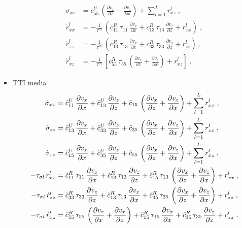 \begin{itemize}
\begin{subequations}
\begin{align}
            \dot{\sigma}_{xz} &= c_{55}^U\,\left(\frac{\partial v_x}{\partial z}+\frac{\partial v_z}{\partial x}\right)+\sum_{l=1}^{L}r_{xz}^l\;,\\     
            \dot{r}_{xx}^l &= -\frac{1}{\tau^{\sigma l}}\,\left(c_{11}^R\,\tau_{11}\,\frac{\partial v_x}{\partial x}+c_{13}^R\,\tau_{13}\,\frac{\partial v_z}{\partial z}+r_{xx}^l\right)\;,\\
            \dot{r}_{zz}^l &= -\frac{1}{\tau^{\sigma l}}\, \left(c_{13}^R\,\tau_{13}\,\frac{\partial v_x}{\partial x}+c_{33}^R\,\tau_{33}\,\frac{\partial v_z}{\partial z}+r_{zz}^l \right)\,,\\
            \dot{r}_{xz}^l &= -\frac{1}{\tau^{\sigma l}}\, \left[c_{55}^R\,\tau_{55}\,\left(\frac{\partial v_x}{\partial z}+\frac{\partial v_z}{\partial x}\right)+r_{xz}^l \right]\;.
            \label{eq:wave_eq_vti}
        \end{align}
        \end{subequations}
    \item TTI media
        \begin{subequations}
        \allowdisplaybreaks
        \begin{align}
            \dot{\sigma}_{xx} &= \Tilde{c}_{11}^U\,\frac{\partial v_x}{\partial x}+\Tilde{c}_{13}^U\,\frac{\partial v_z}{\partial z}+\Tilde{c}_{15}\,\left(\frac{\partial v_x}{\partial z}+\frac{\partial v_z}{\partial x}\right)+\sum_{l=1}^{L}r_{xx}^l\;,\\   
            \dot{\sigma}_{zz} &= 
            \Tilde{c}_{13}^U\,\frac{\partial v_x}{\partial x}+\Tilde{c}_{33}^U\,\frac{\partial v_z}{\partial z}+\Tilde{c}_{35}\,\left(\frac{\partial v_x}{\partial z}+\frac{\partial v_z}{\partial x}\right)+\sum_{l=1}^{L}r_{zz}^l\;,\\
            \dot{\sigma}_{xz} &= \Tilde{c}_{15}^U\,\frac{\partial v_x}{\partial x}+\Tilde{c}_{35}^U\,\frac{\partial v_z}{\partial z}+\Tilde{c}_{55}\,\left(\frac{\partial v_x}{\partial z}+\frac{\partial v_z}{\partial x}\right)+\sum_{l=1}^{L}r_{xz}^l\;,\\
            -\tau_{\sigma l}\,\dot{r}_{xx}^l &=  \Tilde{c}_{11}^R\,\tau_{11}\,\frac{\partial v_x}{\partial x}+\Tilde{c}_{13}^R\,\tau_{13}\,\frac{\partial v_z}{\partial z}+\Tilde{c}_{15}^R\,\tau_{13}\,\left(\frac{\partial v_x}{\partial z}+\frac{\partial v_z}{\partial x}\right)+r_{xx}^l\;,\\
            -\tau_{\sigma l}\,\dot{r}_{zz}^l &=  \Tilde{c}_{33}^R\,\tau_{33}\,\frac{\partial v_z}{\partial z}+\Tilde{c}_{13}^R\,\tau_{13}\,\frac{\partial v_x}{\partial x}+\Tilde{c}_{35}^R\,\tau_{35}\,\left(\frac{\partial v_x}{\partial z}+\frac{\partial v_z}{\partial x}\right)+r_{zz}^l\;,\\
            -\tau_{\sigma l}\,\dot{r}_{xz}^l &=  \Tilde{c}_{55}^R\,\tau_{55}\,\left(\frac{\partial v_z}{\partial x}+\frac{\partial v_x}{\partial z}\right)+\Tilde{c}_{15}^R\,\tau_{15}\,\frac{\partial v_x}{\partial x}+\Tilde{c}_{35}^R\,\tau_{35}\,\frac{\partial v_z}{\partial z}+r_{xz}^l\;.
            \label{eq:wave_eq_tti}
        \end{align}
        \end{subequations}
\end{itemize}

